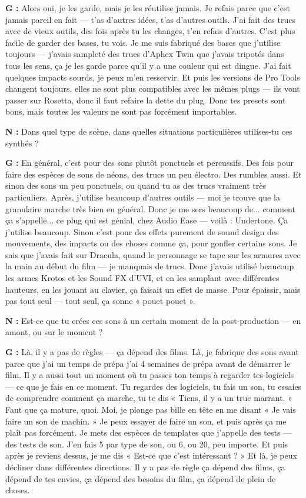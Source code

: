 ﻿\documentclass[12pt]{article}
\begin{document}
\textbf{G :} Alors oui, je les garde, mais je les réutilise jamais. Je refais parce que c'est jamais pareil en fait — t'as d'autres idées, t'as d'autres outils. J'ai fait des trucs avec de vieux outils, des fois après tu les changes, t'en refais d'autres. C'est plus facile de garder des bases, tu vois. Je me suis fabriqué des bases que j'utilise toujours — j'avais sampleté des trucs d'Aphex Twin que j'avais tripotés dans tous les sens, ça je les garde parce qu'il y a une couleur qui est dingue. J'ai fait quelques impacts sourds, je peux m'en resservir. Et puis les versions de Pro Tools changent toujours, elles ne sont plus compatibles avec les mêmes plugs — ils vont passer sur Rosetta, donc il faut refaire la dette du plug. Donc tes presets sont bons, mais toutes les valeurs ne sont pas forcément importables.

\textbf{N :} Dans quel type de scène, dans quelles situations particulières utilises-tu ces synthés ?

\textbf{G :} En général, c'est pour des sons plutôt ponctuels et percussifs. Des fois pour faire des espèces de sons de néons, des trucs un peu électro. Des rumbles aussi. Et sinon des sons un peu ponctuels, ou quand tu as des trucs vraiment très particuliers. Après, j'utilise beaucoup d'autres outils — moi je trouve que la granulaire marche très bien en général. Donc je me sers beaucoup de... comment ça s'appelle... ce plug qui est génial, chez Audio Ease — voilà : Undertone. Ça j'utilise beaucoup. Sinon c'est pour des effets purement de sound design des mouvements, des impacts ou des choses comme ça, pour gonfler certains sons. Je sais que j'avais fait sur Dracula, quand le personnage se tape sur les armures avec la main au début du film — je manquais de trucs. Donc j'avais utilisé beaucoup les armes Krotos et les Sound FX d'UVI, et en les samplant avec différentes hauteurs, en les jouant au clavier, ça faisait un effet de masse. Pour épaissir, mais pas tout seul — tout seul, ça sonne « pouet pouet ».

\textbf{N :} Est-ce que tu crées ces sons à un certain moment de la post-production — en amont, ou sur le moment ?

\textbf{G :} Là, il y a pas de règles — ça dépend des films. Là, je fabrique des sons avant parce que j'ai un temps de prépa j'ai 4 semaines de prépa avant de démarrer le film. Il y a aussi tout un moment où tu passes ton temps à regarder tes logiciels — ce que je fais en ce moment. Tu regardes des logiciels, tu fais un son, tu essaies de comprendre comment ça marche, tu te dis « Tiens, il y a un truc marrant. » Faut que ça mature, quoi. Moi, je plonge pas bille en tête en me disant « Je vais faire un son de machin. » Je peux essayer de faire un son, et puis après ça me plaît pas forcément. Je mets des espèces de templates que j'appelle des tests — des tests de son. J'en fais 5 par type de son, ou 6, ou 20, peu importe. Et puis après je reviens dessus, je me dis « Est-ce que c'est intéressant ? » Et là, je peux décliner dans différentes directions. Il y a pas de règle ça dépend des films, ça dépend de tes envies, ça dépend des besoins du film, ça dépend de plein de choses.
\end{document}
